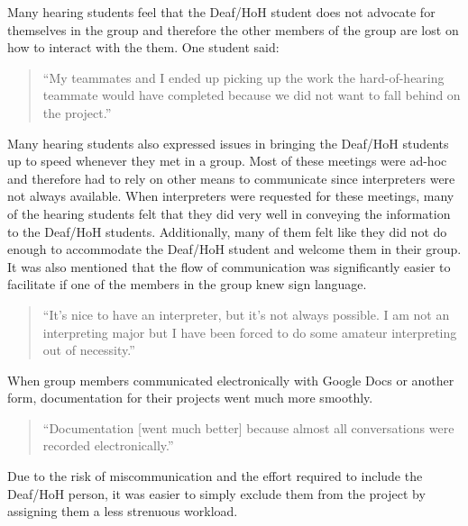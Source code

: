 \documentclass[conference]{IEEEtran}
\begin{document}
Many hearing students feel that the Deaf/HoH student does not advocate for themselves in the group and therefore the other members of the group are lost on how to interact with the them. One student said:

\begin{quotation}
``My teammates and I ended up picking up the work the hard-of-hearing teammate would have completed because we did not want to fall behind on the project.''
\end{quotation}

Many hearing students also expressed issues in bringing the Deaf/HoH students up to speed whenever they met in a group. Most of these meetings were ad-hoc and therefore had to rely on other means to communicate since interpreters were not always available. When interpreters were requested for these meetings, many of the hearing students felt that they did very well in conveying the information to the Deaf/HoH students. Additionally, many of them felt like they did not do enough to accommodate the Deaf/HoH student and welcome them in their group. It was also mentioned that the flow of communication was significantly easier to facilitate if one of the members in the group knew sign language.


\begin{quotation}
``It's nice to have an interpreter, but it's not always possible. I am not an interpreting major but I have been forced to do some amateur interpreting out of necessity.''
\end{quotation}

When group members communicated electronically with Google Docs or another form, documentation for their projects went much more smoothly.

\begin{quotation}
``Documentation [went much better] because almost all conversations were recorded electronically.''
\end{quotation}

Due to the risk of miscommunication and the effort required to include the Deaf/HoH person, it was easier to simply exclude them from the project by assigning them a less strenuous workload.
\end{document}
